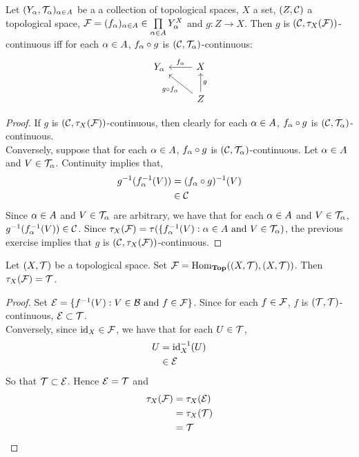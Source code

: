 \documentclass{book}
\begin{document}
	\begin{ex} 
		Let $(Y_{\alpha}, \mathcal{T}_{\alpha})_{\alpha \in A}$ be a a collection of topological spaces, $X$ a set, $(Z, \mathcal{C})$ a topological space, $\mathcal{F} = (f_{\alpha})_{\alpha \in A} \in \prod \limits_{\alpha \in A}Y_{\alpha}^X$ and $g: Z \rightarrow X$. Then $g$ is $(\mathcal{C},\tau_X(\mathcal{F}))$-continuous iff for each $\alpha \in A$, $f_{\alpha} \circ g$ is $(\mathcal{C}, \mathcal{T}_{\alpha})$-continuous:
		\[ \begin{tikzcd}
			Y_{\al}	
			& X  \arrow[l, "f_{\al}"'] \\
			& Z \arrow[ul, "g \circ f_{\al}"]  \arrow[u, "g"']
		\end{tikzcd}
		\]
	\end{ex}
	
	\begin{proof}
		If $g$ is $(\mathcal{C},\tau_X(\mathcal{F}))$-continuous, then clearly for each $\alpha \in A$, $ f_{\alpha} \circ g$ is $(\mathcal{C}, \mathcal{T}_{\alpha})$- continuous. \\
		Conversely, suppose that for each $\alpha \in A$, $f_{\alpha} \circ g$ is $(\mathcal{C}, \mathcal{T}_{\alpha})$-continuous. Let $\alpha \in A$ and $V \in \mathcal{T}_{\alpha}$. Continuity implies that,
		\begin{align*}
			g^{-1}(f_{\alpha}^{-1}(V)) 
			& = (f_{\alpha} \circ g)^{-1}(V) \\
			& \in \mathcal{C}
		\end{align*}
		Since $\alpha \in A$ and $V \in \mathcal{T}_{\alpha}$ are arbitrary, we have that for each $\alpha \in A$ and $V \in \mathcal{T}_{\alpha}$, $g^{-1}(f_{\alpha}^{-1}(V)) \in \mathcal{C}$. Since $\tau_X(\mathcal{F}) = \tau(\{f_{\alpha}^{-1}(V): \alpha \in A \text{ and } V \in \mathcal{T}_{\alpha})$, the previous exercise implies that $g$ is $(\mathcal{C},\tau_X(\mathcal{F}))$-continuous.
	\end{proof}

	\begin{ex} 
		Let $(X, \mathcal{T})$ be a topological space. Set $\mathcal{F} = \operatorname{Hom}_{\operatorname*{\text{\textbf{Top}}}}((X, \mathcal{T}), (X, \mathcal{T}))$. Then $\tau_X(\mathcal{F}) = \mathcal{T}$.
	\end{ex}

	\begin{proof}
		Set $\mathcal{E} = \{f^{-1}(V): V \in \mathcal{B} \text{ and } f \in \mathcal{F} \}$. Since for each $f \in \mathcal{F}$, $f$ is $(\mathcal{T}, \mathcal{T})$-continuous, $\mathcal{E} \subset \mathcal{T}$. \\
		Conversely, since $\operatorname{id}_X \in \mathcal{F}$, we have that for each $U \in \mathcal{T}$, 
		\begin{align*}
			U
			& = \operatorname{id}_X^{-1}(U) \\
			& \in \mathcal{E} 
		\end{align*}
		So that $\mathcal{T} \subset \mathcal{E}$. Hence $\mathcal{E} = \mathcal{T}$ and 
		\begin{align*}
			\tau_X(\mathcal{F})
			& = \tau_X(\mathcal{E}) \\
			& = \tau_X(\mathcal{T}) \\
			& = \mathcal{T}
		\end{align*}
	\end{proof}
	
\end{document}
